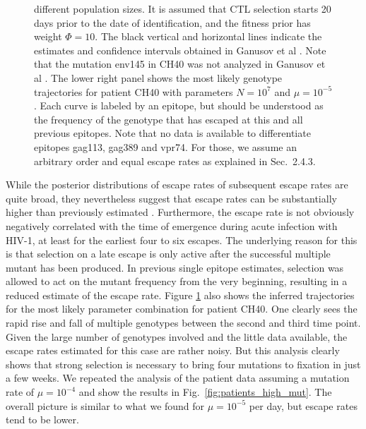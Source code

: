\documentclass{frontiers}
\newcommand{\FIG}[1]{Fig.~\ref{fig:#1}}
\newcommand{\fitprior}{\Phi}
\begin{document}
\begin{figure}[htp]
\begin{center}
{  different population sizes. It is assumed that CTL selection starts 20 days
  prior to the date of identification, and the fitness prior has weight
  $\fitprior=10$. The black vertical and horizontal lines indicate the
  estimates and confidence intervals obtained in
  Ganusov et al \cite{ganusov_fitness_2011}. Note that the mutation env145 in
  CH40 was not analyzed in Ganusov et al \cite{ganusov_fitness_2011}. 
The lower right panel shows the most likely genotype trajectories for patient CH40 with 
parameters $N=10^{7}$ and $\mu=10^{-5}$. Each curve is labeled by an epitope, but should
be understood as the frequency of the genotype that has escaped at this and all previous epitopes. Note
that no data is available to differentiate epitopes gag113, gag389 and vpr74. For those, we assume an
arbitrary order and equal escape rates as explained in Sec.~2.4.3. }
  \label{fig:patients}
\end{center}
\end{figure}


While the posterior distributions of escape rates of subsequent escape
rates are quite broad, they nevertheless suggest
that escape rates can be substantially higher than previously
estimated \citep{ganusov_fitness_2011,Asquith:2006p28003}.
Furthermore, the escape rate is not obviously negatively correlated with the
time of emergence during acute infection with HIV-1, at least for the
earliest four to six escapes.
The underlying reason for this is that selection on a late escape is only active after the
successful multiple mutant has been produced. In previous single epitope
estimates, selection was allowed to act on the mutant frequency from the very
beginning, resulting in a reduced estimate of the escape rate. Figure
\ref{fig:patients} also shows the inferred trajectories for the most
likely parameter combination for patient CH40. One clearly sees the
rapid rise and fall of multiple genotypes between the second and third
time point. Given the large number of genotypes involved and the little
data available, the escape rates estimated for this case are rather
noisy. But this analysis clearly shows that strong selection is
necessary to bring four mutations to fixation in just a few weeks.
We repeated the analysis of the patient data assuming a mutation rate of
$\mu=10^{-4}$ and show the results in \FIG{patients_high_mut}. The
overall picture is similar to what we found for $\mu=10^{-5}$ per day,
but escape rates tend to be lower.
\end{document}
